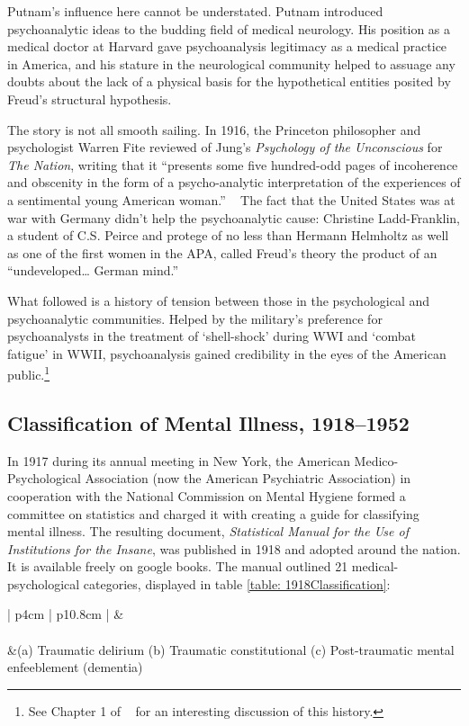 \begin{refsection}
Putnam's influence here cannot be understated. Putnam introduced psychoanalytic ideas to the budding field of medical neurology. His position as a medical doctor at Harvard gave psychoanalysis legitimacy as a medical practice in America, and his stature in the neurological community helped to assuage any doubts about the lack of a physical basis for the hypothetical entities posited by Freud's structural hypothesis.

The story is not all smooth sailing. In 1916, the Princeton philosopher and psychologist Warren Fite reviewed of Jung's \emph{Psychology of the Unconscious} for \emph{The Nation}, writing that it ``presents some five hundred-odd pages of incoherence and obscenity in the form of a psycho-analytic interpretation of the experiences of a sentimental young American woman.'' ~\citep{Fite:1916tk} The fact that the United States was at war with Germany didn't help the psychoanalytic cause: Christine Ladd-Franklin, a student of C.S. Peirce and protege of no less than Hermann Helmholtz as well as one of the first women in the APA, called Freud's theory the product of an ``undeveloped{\ldots} German mind.''

What followed is a history of tension between those in the psychological and psychoanalytic communities. Helped by the military's preference for psychoanalysts in the treatment of `shell-shock' during WWI and `combat fatigue' in WWII, psychoanalysis gained credibility in the eyes of the American public.\footnote{See Chapter 1 of ~\citep{Menninger:3tUbEPj8} for an interesting discussion of this history.}

\subsection{Classification of Mental Illness, 1918--1952}
\label{classificationofmentalillness1918-1952}

In 1917 during its annual meeting in New York, the American Medico-Psychological Association (now the American Psychiatric Association) in cooperation with the National Commission on Mental Hygiene formed a committee on statistics and charged it with creating a guide for classifying mental illness. The resulting document, \emph{Statistical Manual for the Use of Institutions for the Insane}, was published in 1918 and adopted around the nation. It is available freely on google books. The manual outlined 21 medical-psychological categories, displayed in table \ref{table: 1918Classification}:

 \begin{longtable}[!t]{ | p{4cm} | p{10.8cm} | }
\hline
{}& \\ \hline
{} \\ \hline
 &(a) Traumatic delirium \newline
(b) Traumatic constitutional \newline
(c) Post-traumatic mental enfeeblement (dementia)\\


\end{longtable}
\end{refsection}
